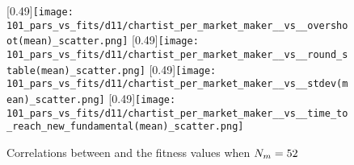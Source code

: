 \begin{figure}
	\centering
	\subcaptionbox{}
	[0.49\linewidth]{\texttt{[image: 101\_pars\_vs\_fits/d11/chartist\_per\_market\_maker\_\_vs\_\_overshoot(mean)\_scatter.png]}}
	\subcaptionbox{}
	[0.49\linewidth]{\texttt{[image: 101\_pars\_vs\_fits/d11/chartist\_per\_market\_maker\_\_vs\_\_round\_stable(mean)\_scatter.png]}}
	\vspace{0.5cm}
	\subcaptionbox{}
	[0.49\linewidth]{\texttt{[image: 101\_pars\_vs\_fits/d11/chartist\_per\_market\_maker\_\_vs\_\_stdev(mean)\_scatter.png]}}
	\subcaptionbox{}
	[0.49\linewidth]{\texttt{[image: 101\_pars\_vs\_fits/d11/chartist\_per\_market\_maker\_\_vs\_\_time\_to\_reach\_new\_fundamental(mean)\_scatter.png]}}
	\caption{Correlations between \ratioagents{} and the fitness values when $N_{m} = 52$}
	\label{fig:parvfit_ratio_d11}
\end{figure}








